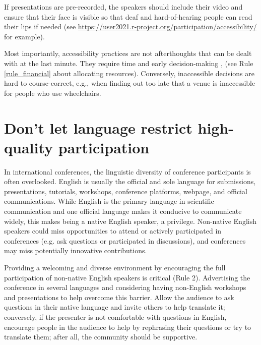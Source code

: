 \documentclass[10pt,letterpaper]{article}
\begin{document}
 If presentations are pre-recorded, the speakers should include their video and ensure that their face is visible so that deaf and hard-of-hearing people can read their lips if needed (see \url{https://user2021.r-project.org/participation/accessibility/} for example). 
 
Most importantly, accessibility practices are not afterthoughts that can be dealt with at the last minute. 
They require time and early decision-making \cite{irishIncreasingParticipationUsing2020}, (see Rule \ref{rule_financial} about allocating resources). Conversely, inaccessible decisions are hard to course-correct, e.g., when finding out too late that a venue is inaccessible for people who use wheelchairs. 



\section{Don't let language restrict high-quality participation}
\label{rule_language}

In international conferences, the linguistic diversity of conference participants is often overlooked. 
English is usually the official and sole language for submissions, presentations, tutorials, workshops, conference platforms, webpage, and official communications. 
While English is the primary language in scientific communication and one official language makes it conducive to communicate widely, this makes being a native English speaker, a privilege.
Non-native English speakers could miss opportunities to attend or actively participated in conferences (e.g. ask questions or participated in discussions),
and conferences may miss potentially innovative contributions.

Providing a welcoming and diverse environment by encouraging the full participation of non-native English speakers is critical (Rule 2). 
Advertising the conference in several languages and considering having non-English workshops and presentations to help overcome this barrier. 
Allow the audience to ask questions in their native language and invite others to help translate it; conversely, if the presenter is not comfortable with questions in English, encourage people in the audience to help by rephrasing their questions or try to translate them; after all, the community should be supportive. 
\end{document}
